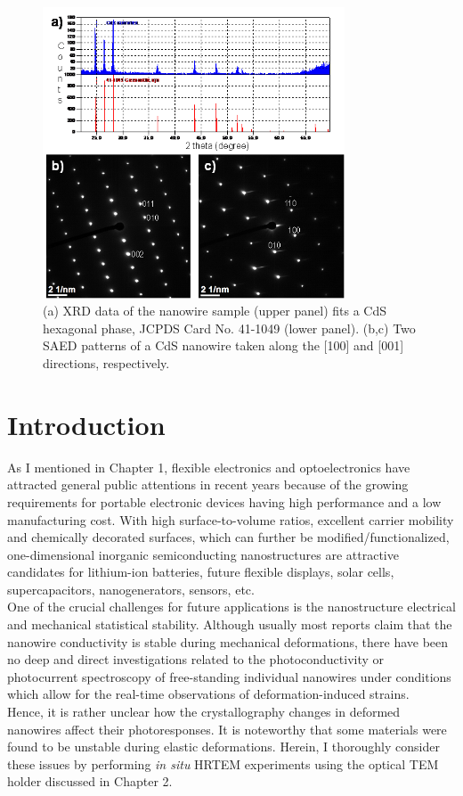 \begin{figure}  [ht]
\centering
\includegraphics[width=0.8\textwidth]{figures/figure6_s1}
\caption[CdS crystallography]
{(a) XRD data of the nanowire sample (upper panel) fits a CdS hexagonal phase, JCPDS Card No. 41-1049 (lower panel). (b,c) Two SAED patterns of a CdS nanowire taken along the [100] and [001] directions, respectively. 
\label{fig:6_s1}}
\end{figure}

\section{Introduction}
As I mentioned in Chapter 1, flexible electronics and optoelectronics have attracted general public attentions in recent years because of the growing requirements for portable electronic devices having high performance and a low manufacturing cost.\cite{Boland2010,Liu2015,Long2012} 
With high surface-to-volume ratios, excellent carrier mobility and chemically decorated surfaces, which can further be modified/functionalized, one-dimensional inorganic semiconducting nanostructures are attractive candidates for lithium-ion batteries,\cite{Wang2015} future flexible displays,\cite{Klauk2008} solar cells,\cite{Zhang2012} supercapacitors,\cite{Li2014} nanogenerators,\cite{Fan2012} sensors,\cite{Zhang2014d} etc. \\
One of the crucial challenges for future applications is the nanostructure electrical and mechanical statistical stability. 
Although usually most reports claim that the nanowire conductivity is stable during mechanical deformations, there have been no deep and direct investigations related to the photoconductivity or photocurrent spectroscopy of free-standing individual nanowires under conditions which allow for the real-time observations of deformation-induced strains. \\
Hence, it is rather unclear how the crystallography changes in deformed nanowires affect their photoresponses. 
It is noteworthy that some materials were found to be unstable during elastic deformations.\cite{Antsov2014}
Herein, I thoroughly consider these issues by performing {\em in situ} HRTEM experiments using the optical TEM holder discussed in Chapter 2. \\

